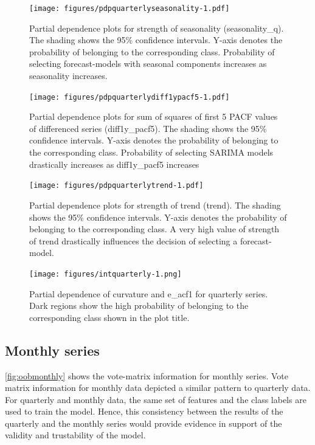 \documentclass[11pt,a4paper,]{article}
\begin{document}
\begin{figure}
\centering
\texttt{[image: figures/pdpquarterlyseasonality-1.pdf]}
\caption{\label{fig:pdpquarterlyseasonality}Partial dependence plots for strength of seasonality (seasonality\_q). The shading shows the 95\% confidence intervals. Y-axis denotes the probability of belonging to the corresponding class. Probability of selecting forecast-models with seasonal components increases as seasonality increases.}
\end{figure}

\begin{figure}
\centering
\texttt{[image: figures/pdpquarterlydiff1ypacf5-1.pdf]}
\caption{\label{fig:pdpquarterlydiff1ypacf5}Partial dependence plots for sum of squares of first 5 PACF values of differenced series (diff1y\_pacf5). The shading shows the 95\% confidence intervals. Y-axis denotes the probability of belonging to the corresponding class. Probability of selecting SARIMA models drastically increases as diff1y\_pacf5 increases}
\end{figure}

\begin{figure}
\centering
\texttt{[image: figures/pdpquarterlytrend-1.pdf]}
\caption{\label{fig:pdpquarterlytrend}Partial dependence plots for strength of trend (trend). The shading shows the 95\% confidence intervals. Y-axis denotes the probability of belonging to the corresponding class. A very high value of strength of trend drastically influences the decision of selecting a forecast-model.}
\end{figure}

\begin{figure}
\centering
\texttt{[image: figures/intquarterly-1.png]}
\caption{\label{fig:intquarterly}Partial dependence of curvature and e\_acf1 for quarterly series. Dark regions show the high probability of belonging to the corresponding class shown in the plot title.}
\end{figure}

\hypertarget{monthly-series}{%
\subsection{Monthly series}\label{monthly-series}}

\autoref{fig:oobmonthly} shows the vote-matrix information for monthly series. Vote matrix information for monthly data depicted a similar pattern to quarterly data. For quarterly and monthly data, the same set of features and the class labels are used to train the model. Hence, this consistency between the results of the quarterly and the monthly series would provide evidence in support of the validity and trustability of the model.
\end{document}
